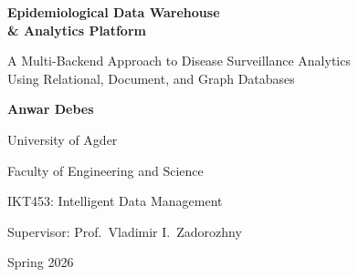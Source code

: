 \documentclass[12pt,a4paper]{article}
\begin{document}
\begin{titlepage}
\centering
\vspace*{2cm}
{\Huge\bfseries Epidemiological Data Warehouse\\[0.3cm] \& Analytics Platform\par}
\vspace{1.5cm}
{\Large A Multi-Backend Approach to Disease Surveillance Analytics\\Using Relational, Document, and Graph Databases\par}
\vspace{2.5cm}
{\large\textbf{Anwar Debes}\par}
\vspace{0.5cm}
{\large University of Agder\par}
\vspace{0.3cm}
{\large Faculty of Engineering and Science\par}
\vspace{2cm}
{\large IKT453: Intelligent Data Management\par}
{\large Supervisor: Prof.\ Vladimir I.\ Zadorozhny\par}
\vspace{0.3cm}
{\large Spring 2026\par}
\vfill
{\large \par}
\end{titlepage}
\end{document}
